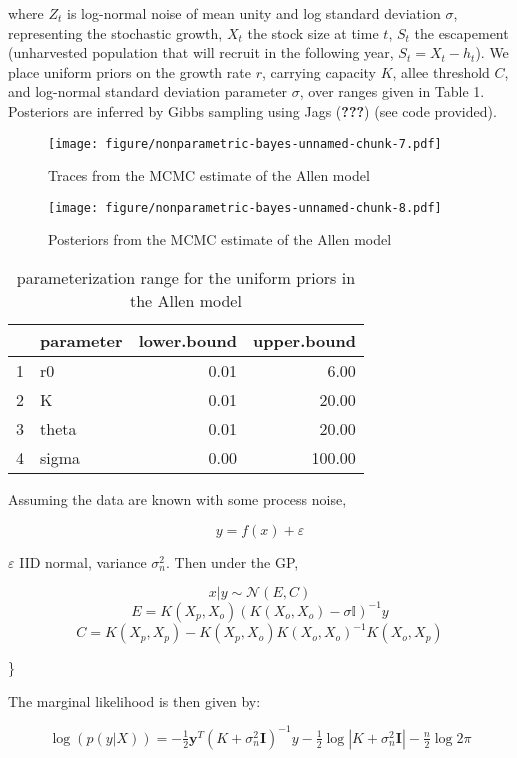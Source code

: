 \documentclass[author-year, review]{elsarticle} %
\makeatletter
\def\maxwidth{\ifdim\Gin@nat@width>\linewidth\linewidth
\else\Gin@nat@width\fi}
\let\Oldincludegraphics\includegraphics
\renewcommand{\includegraphics}[1]{\Oldincludegraphics[width=\maxwidth]{#1}}
\makeatother
\begin{document}
where $Z_t$ is log-normal noise of mean unity and log standard deviation
$\sigma$, representing the stochastic growth, $X_t$ the stock size at
time $t$, $S_t$ the escapement (unharvested population that will recruit
in the following year, $S_t = X_t - h_t$). We place uniform priors on
the growth rate $r$, carrying capacity $K$, allee threshold $C$, and
log-normal standard deviation parameter $\sigma$, over ranges given in
Table 1. Posteriors are inferred by Gibbs sampling using Jags
({\textbf{???}}) (see code provided).

\begin{figure}[htbp]
\centering
\texttt{[image: figure/nonparametric-bayes-unnamed-chunk-7.pdf]}
\caption{Traces from the MCMC estimate of the Allen model}
\end{figure}

\begin{figure}[htbp]
\centering
\texttt{[image: figure/nonparametric-bayes-unnamed-chunk-8.pdf]}
\caption{Posteriors from the MCMC estimate of the Allen model}
\end{figure}

\begin{table}[ht]
\begin{center}
\begin{tabular}{rlrr}
  \hline
 & parameter & lower.bound & upper.bound \\ 
  \hline
1 & r0 & 0.01 & 6.00 \\ 
  2 & K & 0.01 & 20.00 \\ 
  3 & theta & 0.01 & 20.00 \\ 
  4 & sigma & 0.00 & 100.00 \\ 
   \hline
\end{tabular}
\caption{parameterization range for the uniform priors in the Allen model}
\end{center}
\end{table}

Assuming the data are known with some process noise,

\[y = f(x) + \varepsilon\]

$\varepsilon$ IID normal, variance $\sigma_n^2$. Then under the GP,

\[x|y \sim \mathcal{N}(E,C)\]
\[E = K(X_p, X_o) \left(K(X_o,X_o) - \sigma \mathbb{I} \right)  ^{-1} y\]
\[C = K(X_p, X_p) - K(X_p, X_o) K(X_o,X_o)^{-1} K(X_o, X_p)\]

\}

The marginal likelihood is then given by:

\[\log(p(y | X)) = -\tfrac{1}{2} \mathbf{y}^T (K + \sigma_n^2 \mathbf{I})^{-1} y  - \tfrac{1}{2} \log\left| K + \sigma_n^2 \mathbf{I} \right| - \tfrac{n}{2}\log 2 \pi\]
\end{document}

